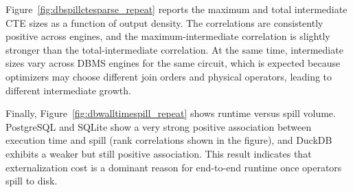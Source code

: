 Figure~\ref{fig:dbspillctesparse_repeat} reports the maximum and total intermediate CTE sizes as
a function of output density. The correlations are consistently
positive across engines, and the maximum-intermediate correlation is slightly stronger
than the total-intermediate correlation. At the same time, intermediate sizes vary across
DBMS engines for the same circuit, which is expected because optimizers may choose
different join orders and physical operators, leading to different intermediate growth.

Finally, Figure~\ref{fig:dbwalltimespill_repeat} shows runtime versus spill volume. PostgreSQL and
SQLite show a very strong positive association between execution time and spill (rank
correlations shown in the figure), and DuckDB exhibits a weaker but
still positive association. This result indicates that externalization cost is a dominant
reason for end-to-end runtime once operators spill to disk. 

\medskip
  \vspace{0.2cm}
\noindent
\setlength{\fboxsep}{6pt}




